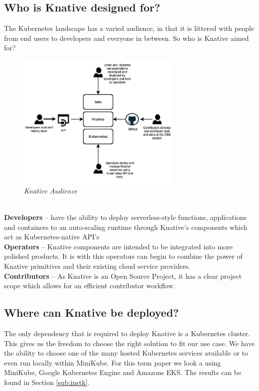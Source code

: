 \subsection{Who is Knative designed for?}
The Kubernetes landscape has a varied audience, in that it is littered with people from end users to developers and everyone in between. So who is Knative aimed for?
\begin{figure}[!ht]
\centering
\includegraphics*[width=0.7\textwidth]{images/knative-audience.png}
\caption{\em Knative Audience}
\label{img:knative-audience}
\end{figure}
\\\textbf{Developers} -- have the ability to deploy serverless-style functions, applications and containers to an auto-scaling runtime through Knative's components which act as Kubernetes-native API's
\\\textbf{Operators} -- Knative components are intended to be integrated into more polished products. It is with this operators can begin to combine the power of Knative primitives and their existing cloud service providers.
\\\textbf{Contributors} -- As Knative is an Open Source Project, it has a clear project scope which allows for an efficient contributor workflow.

\subsection{Where can Knative be deployed?}
The only dependency that is required to deploy Knative is a Kubernetes cluster. This gives us the freedom to choose the right solution to fit our use case. We have the ability to choose one of the many hosted Kubernetes services available or to even run locally within MiniKube. For this term paper we look a using MiniKube, Google Kubernetes Engine and Amazons EKS. The results can be found in Section \ref{sub:instk}.
\clearpage


